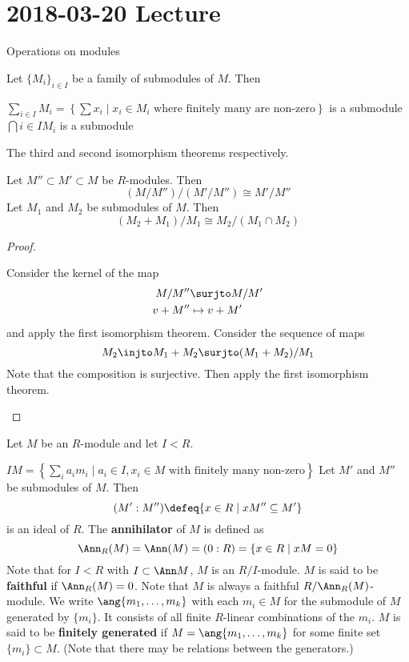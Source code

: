 \section{2018-03-20 Lecture}

Operations on modules

\begin{defn}
	Let $\{M_i\}_{i \in I}$ be a family of submodules of $M$.
	Then
	\begin{enum}
		\io $\displaystyle \sum_{i \in I} M_i = \left\{\sum x_i \mid x_i \in M_i \text{ where finitely many are non-zero}\right\}$ is a submodule
		\io $\displaystyle \bigcap{i \in I} M_i$ is a submodule
	\end{enum}
\end{defn}

\begin{prop}[1.5]
	The third and second isomorphism theorems respectively.
	\begin{enum}
		\io Let $M'' \subset M' \subset M$ be $R$-modules.
		Then
		\[(M/M'')/(M'/M'') \cong M'/M''\]
		\io Let $M_1$ and $M_2$ be submodules of $M$.
		Then
		\[(M_2+M_1)/M_1 \cong M_2/(M_1 \cap M_2)\]
	\end{enum}
\end{prop}

\begin{proof}
	\begin{enum}
		\io Consider the kernel of the map
		\begin{align*}
			M/M'' &\surjto M/M' \\
			v + M'' &\mapsto v + M'
		\end{align*}
		and apply the first isomorphism theorem.
		\io Consider the sequence of maps
		\[M_2 \injto M_1+M_2 \surjto (M_1+M_2)/M_1\]
		Note that the composition is surjective.
		Then apply the first isomorphism theorem.
	\end{enum}
\end{proof}

\begin{defn}[1.6]
	Let $M$ be an $R$-module and let $I<R$.
	\begin{enum}
		\io $\displaystyle IM = \left\{\sum_i a_im_i \mid a_i \in I, x_i \in M \text{ with finitely many non-zero} \right\}$
		\io Let $M'$ and $M''$ be submodules of $M$.
		Then
		\[(M':M'') \defeq \{x \in R \mid xM'' \subseteq M'\}\]
		is an ideal of $R$.
		\io The \textbf{annihilator} of $M$ is defined as
		\[\Ann_R(M) = \Ann(M) = (0:R) = \{x \in R \mid xM = 0\}\]
		Note that for $I<R$ with $I \subset \Ann M$, $M$ is an $R/I$-module.
		\io $M$ is said to be \textbf{faithful} if $\Ann_R(M) = 0$.
		Note that $M$ is always a faithful $R/\Ann_R(M)$-module.
		\io We write $\ang{m_1,\ldots,m_k}$ with each $m_i \in M$ for the submodule of $M$ generated by $\{m_i\}$.
		It consists of all finite $R$-linear combinations of the $m_i$.
		\io $M$ is said to be \textbf{finitely generated} if $M=\ang{m_1,\ldots,m_k}$ for some finite set $\{m_i\} \subset M$.
		(Note that there may be relations between the generators.)
	\end{enum}
\end{defn}

